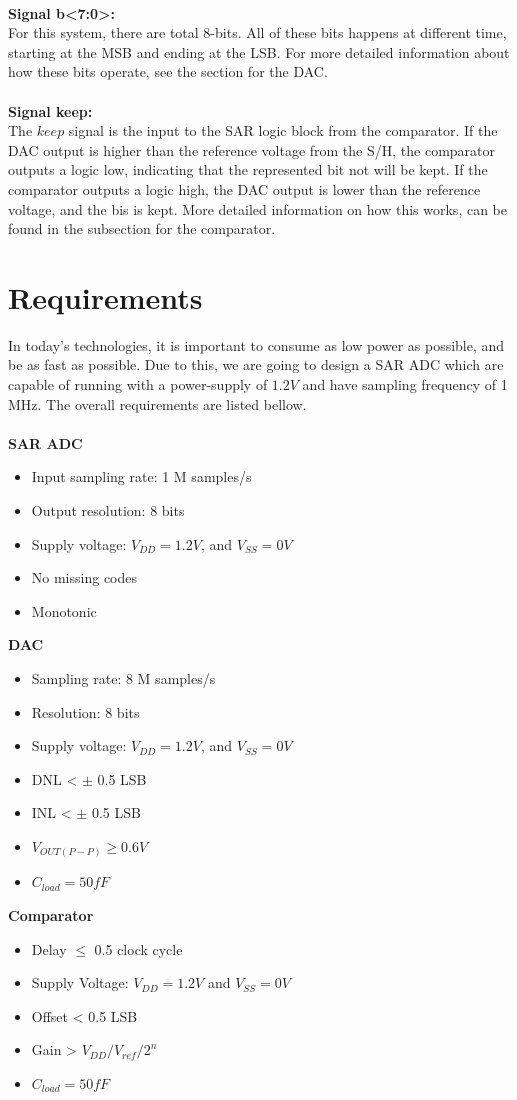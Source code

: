 \documentclass[english, 12pt, a4paper]{ifimaster}
\begin{document}
\\
\textbf{Signal b<7:0>:}\\
For this system, there are total 8-bits. All of these bits happens at different time, starting at the MSB and ending at the LSB. For more detailed information about how these bits operate, see
the section for the DAC.\\
\\
\textbf{Signal keep:}\\
The \(keep\) signal is the input to the SAR logic block from the comparator. If the DAC output is higher than the reference voltage from the S/H, the comparator outputs a logic low, indicating
that the represented bit not will be kept. If the comparator outputs a logic high, the DAC output is lower than the reference voltage, and the bis is kept. More detailed information on how this works, 
can be found in the subsection for the comparator.  



\section{Requirements}
In today's technologies, it is important to consume as low power as possible, and be as fast as possible. Due to this, we are going to design a SAR ADC which are capable 
of running with a power-supply of \(1.2 V\) and have sampling frequency of 1 MHz. The overall requirements are listed bellow.\\
\\
\textbf{SAR ADC}
\begin{itemize}
 \item Input sampling rate: 1 M samples/s
 \item Output resolution: 8 bits
 \item Supply voltage: \(V_{DD} = 1.2 V\), and \(V_{SS} = 0 V\)
 \item No missing codes
 \item Monotonic
\end{itemize}
\textbf{DAC}
\begin{itemize}
 \item Sampling rate: 8 M samples/s
 \item Resolution: 8 bits
 \item Supply voltage: \(V_{DD} = 1.2 V\), and \(V_{SS} = 0 V\)
 \item DNL < \(\pm\) 0.5 LSB
 \item INL < \(\pm\) 0.5 LSB
 \item \(V_{OUT(P-P)} \geq 0.6 V\)
 \item \(C_{load} = 50 fF\)
\end{itemize}
\textbf{Comparator}
\begin{itemize}
 \item Delay \(\leq\) 0.5 clock cycle
 \item Supply Voltage: \(V_{DD} = 1.2V\) and \(V_{SS} = 0V\) 
 \item Offset < 0.5 LSB
 \item Gain > \(V_{DD}/V_{ref}/2^{n}\)
 \item \(C_{load} = 50 fF\)
\end{itemize}
\end{document}

